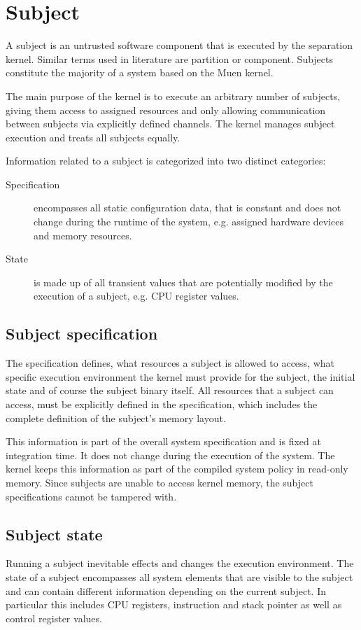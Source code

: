 \section{Subject}\label{sec:design-subject}
A subject is an untrusted software component that is executed by the separation
kernel. Similar terms used in literature are partition or component. Subjects
constitute the majority of a system based on the Muen kernel.

The main purpose of the kernel is to execute an arbitrary number of subjects,
giving them access to assigned resources and only allowing communication between
subjects via explicitly defined channels. The kernel manages subject execution
and treats all subjects equally.

Information related to a subject is categorized into two distinct categories:

\begin{description}
	\item[Specification] encompasses all static configuration data, that is
		constant and does not change during the runtime of the system, e.g.
		assigned hardware devices and memory resources.
	\item[State] is made up of all transient values that are potentially
		modified by the execution of a subject, e.g. CPU register values.
\end{description}

\subsection{Subject specification}
The specification defines, what resources a subject is allowed to access, what
specific execution environment the kernel must provide for the subject, the
initial state and of course the subject binary itself. All resources that a
subject can access, must be explicitly defined in the specification, which
includes the complete definition of the subject's memory layout.

This information is part of the overall system specification and is fixed at
integration time. It does not change during the execution of the system. The
kernel keeps this information as part of the compiled system policy in read-only
memory. Since subjects are unable to access kernel memory, the subject
specifications cannot be tampered with.

\subsection{Subject state}
Running a subject inevitable effects and changes the execution environment. The
state of a subject encompasses all system elements that are visible to the
subject and can contain different information depending on the current subject.
In particular this includes CPU registers, instruction and stack pointer as well
as control register values.

